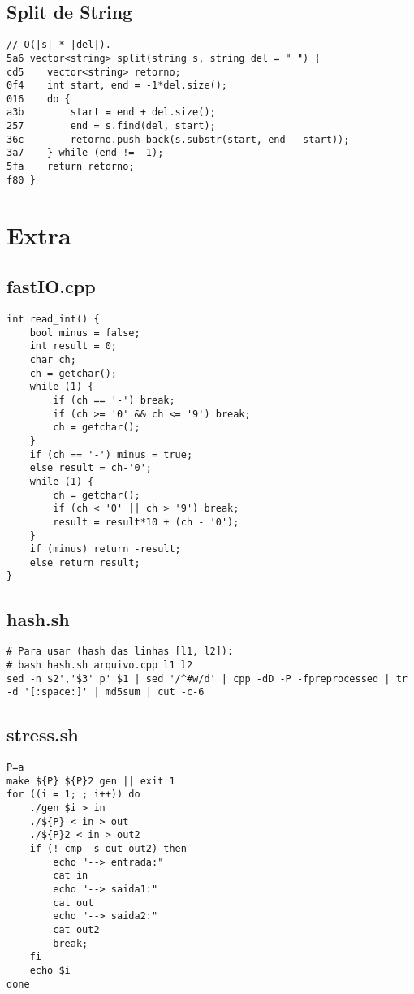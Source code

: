 \documentclass[11pt, a4paper, twoside]{article}
\begin{document}
\subsection{Split de String}
\begin{lstlisting}
// O(|s| * |del|).
5a6 vector<string> split(string s, string del = " ") {
cd5    vector<string> retorno;
0f4    int start, end = -1*del.size();
016    do {
a3b        start = end + del.size();
257        end = s.find(del, start);
36c        retorno.push_back(s.substr(start, end - start));
3a7    } while (end != -1);
5fa    return retorno;
f80 }
\end{lstlisting}

\pagebreak


%
%

\section{Extra}

\subsection{fastIO.cpp}
\begin{lstlisting}
int read_int() {
    bool minus = false;
    int result = 0;
    char ch;
    ch = getchar();
    while (1) {
        if (ch == '-') break;
        if (ch >= '0' && ch <= '9') break;
        ch = getchar();
    }
    if (ch == '-') minus = true;
    else result = ch-'0';
    while (1) {
        ch = getchar();
        if (ch < '0' || ch > '9') break;
        result = result*10 + (ch - '0');
    }
    if (minus) return -result;
    else return result;
}
\end{lstlisting}

\subsection{hash.sh}
\begin{lstlisting}
# Para usar (hash das linhas [l1, l2]):
# bash hash.sh arquivo.cpp l1 l2
sed -n $2','$3' p' $1 | sed '/^#w/d' | cpp -dD -P -fpreprocessed | tr -d '[:space:]' | md5sum | cut -c-6
\end{lstlisting}

\subsection{stress.sh}
\begin{lstlisting}
P=a
make ${P} ${P}2 gen || exit 1
for ((i = 1; ; i++)) do
	./gen $i > in
	./${P} < in > out
	./${P}2 < in > out2
	if (! cmp -s out out2) then
		echo "--> entrada:"
		cat in
		echo "--> saida1:"
		cat out
		echo "--> saida2:"
		cat out2
		break;
	fi
	echo $i
done
\end{lstlisting}
\end{document}
